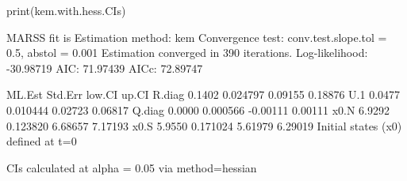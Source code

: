 \begin{Schunk}
\begin{Sinput}
 print(kem.with.hess.CIs)
\end{Sinput}
\begin{Soutput}
MARSS fit is
Estimation method: kem 
Convergence test: conv.test.slope.tol = 0.5, abstol = 0.001
Estimation converged in 390 iterations. 
Log-likelihood: -30.98719 
AIC: 71.97439   AICc: 72.89747   
 
       ML.Est  Std.Err   low.CI   up.CI
R.diag 0.1402 0.024797  0.09155 0.18876
U.1    0.0477 0.010444  0.02723 0.06817
Q.diag 0.0000 0.000566 -0.00111 0.00111
x0.N   6.9292 0.123820  6.68657 7.17193
x0.S   5.9550 0.171024  5.61979 6.29019
Initial states (x0) defined at t=0

CIs calculated at alpha = 0.05 via method=hessian 
\end{Soutput}
\end{Schunk}
